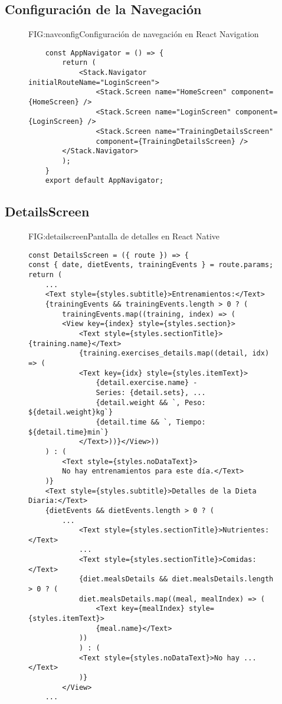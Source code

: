 \newpage

\subsection{Configuración de la Navegación}
\begin{figure}[Configuración de Navegación]{FIG:navconfig}{Configuración de navegación en React Navigation}
    \begin{verbatim}
    const AppNavigator = () => {
        return (
            <Stack.Navigator initialRouteName="LoginScreen">
                <Stack.Screen name="HomeScreen" component={HomeScreen} />
                <Stack.Screen name="LoginScreen" component={LoginScreen} />
                <Stack.Screen name="TrainingDetailsScreen" 
                component={TrainingDetailsScreen} />
        </Stack.Navigator>
        );
    }
    export default AppNavigator;
    \end{verbatim}
    \end{figure}

\newpage

\subsection{DetailsScreen}

\begin{figure}[Pantalla de Detalles]{FIG:detailscreen}{Pantalla de detalles en React Native}
    \begin{verbatim}
const DetailsScreen = ({ route }) => {
const { date, dietEvents, trainingEvents } = route.params;
return (
    ...
    <Text style={styles.subtitle}>Entrenamientos:</Text>
    {trainingEvents && trainingEvents.length > 0 ? (
        trainingEvents.map((training, index) => (
        <View key={index} style={styles.section}>
            <Text style={styles.sectionTitle}>{training.name}</Text>
            {training.exercises_details.map((detail, idx) => (
            <Text key={idx} style={styles.itemText}>
                {detail.exercise.name} - 
                Series: {detail.sets}, ...
                {detail.weight && `, Peso: ${detail.weight}kg`}
                {detail.time && `, Tiempo: ${detail.time}min`}
            </Text>))}</View>))
    ) : (
        <Text style={styles.noDataText}>
        No hay entrenamientos para este día.</Text>
    )}
    <Text style={styles.subtitle}>Detalles de la Dieta Diaria:</Text>
    {dietEvents && dietEvents.length > 0 ? (
        ...
            <Text style={styles.sectionTitle}>Nutrientes:</Text>
            ...
            <Text style={styles.sectionTitle}>Comidas:</Text>
            {diet.mealsDetails && diet.mealsDetails.length > 0 ? (
            diet.mealsDetails.map((meal, mealIndex) => (
                <Text key={mealIndex} style={styles.itemText}>
                {meal.name}</Text>
            ))
            ) : (
            <Text style={styles.noDataText}>No hay ...</Text>
            )}
        </View>
    ...
    \end{verbatim}
    \end{figure}